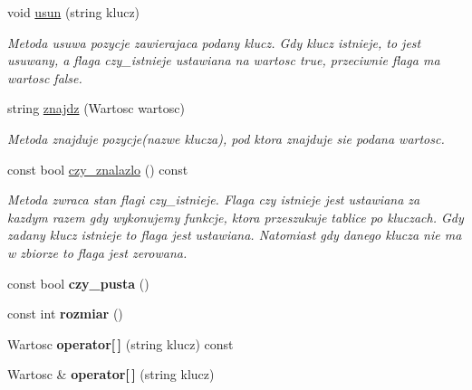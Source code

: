 \begin{DoxyCompactItemize}
\item 
void \hyperlink{class_tablica__asocjacyjna_afd59394ebe460dff2732c97116005a5c}{usun} (string klucz)
\begin{DoxyCompactList}\small\item\em Metoda usuwa pozycje zawierajaca podany klucz. Gdy klucz istnieje, to jest usuwany, a flaga czy\-\_\-istnieje ustawiana na wartosc true, przeciwnie flaga ma wartosc false. \end{DoxyCompactList}\item 
string \hyperlink{class_tablica__asocjacyjna_af99446598978438d5a1e77e6657292e9}{znajdz} (Wartosc wartosc)
\begin{DoxyCompactList}\small\item\em Metoda znajduje pozycje(nazwe klucza), pod ktora znajduje sie podana wartosc. \end{DoxyCompactList}\item 
const bool \hyperlink{class_tablica__asocjacyjna_a5b8554ed74cb3317915821ac3a286ca1}{czy\-\_\-znalazlo} () const 
\begin{DoxyCompactList}\small\item\em Metoda zwraca stan flagi czy\-\_\-istnieje. Flaga czy istnieje jest ustawiana za kazdym razem gdy wykonujemy funkcje, ktora przeszukuje tablice po kluczach. Gdy zadany klucz istnieje to flaga jest ustawiana. Natomiast gdy danego klucza nie ma w zbiorze to flaga jest zerowana. \end{DoxyCompactList}\item 
\hypertarget{class_tablica__asocjacyjna_ad05545c839116c28bb9b553f88a8da52}{const bool {\bfseries czy\-\_\-pusta} ()}\label{class_tablica__asocjacyjna_ad05545c839116c28bb9b553f88a8da52}

\item 
\hypertarget{class_tablica__asocjacyjna_ac607feab7cf7ad90ff2ac3f403f797ad}{const int {\bfseries rozmiar} ()}\label{class_tablica__asocjacyjna_ac607feab7cf7ad90ff2ac3f403f797ad}

\item 
\hypertarget{class_tablica__asocjacyjna_a0b65da983c3b72819a8445943f443394}{Wartosc {\bfseries operator\mbox{[}$\,$\mbox{]}} (string klucz) const }\label{class_tablica__asocjacyjna_a0b65da983c3b72819a8445943f443394}

\item 
\hypertarget{class_tablica__asocjacyjna_a64ccb57bf9e2634cc414cbba9f7ef6e0}{Wartosc \& {\bfseries operator\mbox{[}$\,$\mbox{]}} (string klucz)}\label{class_tablica__asocjacyjna_a64ccb57bf9e2634cc414cbba9f7ef6e0}

\end{DoxyCompactItemize}


